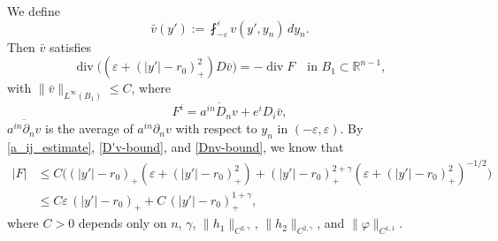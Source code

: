 \documentclass[reqno, 10pt]{amsart}
\theoremstyle{plain}
\theoremstyle{definition}
\theoremstyle{remark}
\newcommand{\dv}{\operatorname{div}}
\numberwithin{equation}{section}
\newcommand{\bR}{\mathbb{R}}
\begin{document}
We define
\begin{equation}
\label{v_bar_def}
\bar{v}(y') := \fint_{-\varepsilon}^\varepsilon v(y',y_n)\, dy_n.
\end{equation}
Then $\bar{v}$ satisfies
\begin{equation}\label{equation_v_bar}
\dv\big((\varepsilon+(|y'|-r_0)_+^2)D \bar v\big)= - \dv F  \quad\text{in}\,\,B_{1}\subset \bR^{n-1},
\end{equation}
with $\| \bar{v} \|_{L^\infty(B_{1})} \le C$, where
$$
F^i = \overline{a^{in}D_n v} + e^i D_i \bar v,
$$
$\overline{a^{in}\partial_n v}$ is the average of $a^{in}\partial_n v$ with respect to $y_n$ in $(-\varepsilon,\varepsilon)$. By \eqref{a_ij_estimate}, \eqref{D'v-bound}, and \eqref{Dnv-bound}, we know that
\begin{equation}\label{estimate_F}
\begin{aligned}
|F| &\le C\big((|y'|-r_0)_+(\varepsilon + (|y'|-r_0)_+^2) + (|y'|-r_0)_+^{2+\gamma}(\varepsilon+(|y'|-r_0)_+^2)^{-1/2}\big)\\
&\le C\varepsilon\,(|y'|-r_0)_+ +C\,(|y'|-r_0)_+^{1+\gamma},
\end{aligned}
\end{equation}
where $C>0$ depends only on $n$, $\gamma$, $\|h_1\|_{C^{2,\gamma}}$, $\|h_2\|_{C^{2,\gamma}}$, and $\|\varphi\|_{C^{1,1}}$.
\end{document}
